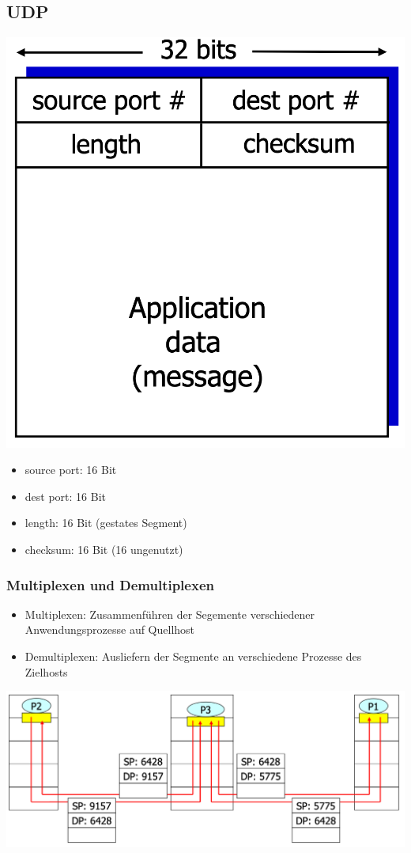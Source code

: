 \subsection{UDP}
\begin{multicols}{2}
\includegraphics[scale=0.125]{images/UDP_segment.png}
\begin{itemize}
	\item source port: 16 Bit
	\item dest port: 16 Bit
	\item length: 16 Bit (gestates Segment)
	\item checksum: 16 Bit (16  \Rightarrow ungenutzt)
\end{itemize}
\end{multicols}
\subsubsection{Multiplexen und Demultiplexen}
\begin{itemize}
	\item Multiplexen: Zusammenführen der Segemente verschiedener Anwendungsprozesse auf Quellhost
	\item Demultiplexen: Ausliefern der Segmente an verschiedene Prozesse des Zielhosts
\end{itemize}
\begin{center}
	\includegraphics[scale=0.25]{images/UPD_Multiplexen.png}
\end{center}
